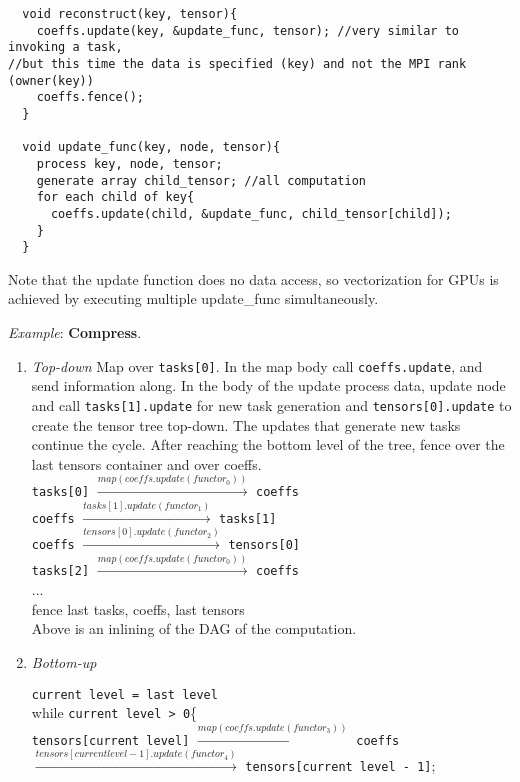 \documentclass{article}
\begin{document}
\begin{enumerate}
\begin{verbatim}
  void reconstruct(key, tensor){
    coeffs.update(key, &update_func, tensor); //very similar to invoking a task,
//but this time the data is specified (key) and not the MPI rank (owner(key))  
    coeffs.fence();
  }

  void update_func(key, node, tensor){
    process key, node, tensor;
    generate array child_tensor; //all computation
    for each child of key{
      coeffs.update(child, &update_func, child_tensor[child]);
    }
  }
\end{verbatim}

Note that the update function does no data access, so vectorization for
GPUs is achieved by executing multiple update\_func simultaneously.

{\em Example}: {\bf Compress}. 

\begin{enumerate}

\item{\em Top-down} Map over {\tt tasks[0]}. In the map
body call {\tt coeffs.update}, and send information along. In the body of the
update process data, update node and call {\tt tasks[1].update} for new task
generation and {\tt tensors[0].update} to create the tensor tree top-down.
The updates that generate new tasks continue the cycle. After reaching
the bottom level of the tree, fence over the last tensors container and
over coeffs.\\

{\tt tasks[0]} $\xrightarrow{map(coeffs.update(functor_0))}$ {\tt coeffs}\\
{\tt coeffs} $\xrightarrow{tasks[1].update(functor_1)}$ {\tt tasks[1] }\\ 
{\tt coeffs} $\xrightarrow{tensors[0].update(functor_2)}$ {\tt tensors[0] }\\ 
{\tt tasks[2]} $\xrightarrow{map(coeffs.update(functor_0))}$ {\tt coeffs}\\
...\\
fence last tasks, coeffs, last tensors\\

Above is an inlining of the DAG of the computation.

\item{\em Bottom-up}

{\tt current level = last level}\\
while {\tt current level > 0}\{\\

{\tt tensors[current level]} $\xrightarrow{map(coeffs.update(functor_3))}$ {\tt coeffs}
$\xrightarrow{tensors[current level - 1].update(functor_4)}$ {\tt tensors[current level - 1]};\\


\end{enumerate}
\end{enumerate}
\end{document}
